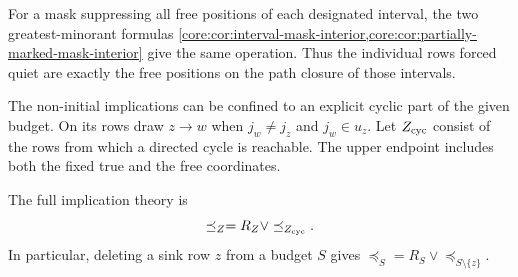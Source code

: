For a mask suppressing all free positions of each designated interval,
the two greatest-minorant formulas
\cref{core:cor:interval-mask-interior,core:cor:partially-marked-mask-interior}
give the same operation. Thus the individual rows forced quiet are
exactly the free positions on the path closure of those intervals.

The non-initial implications can be confined to an explicit cyclic part
of the given budget. On its rows draw $z\to w$ when
$j_w\ne j_z$ and $j_w\in u_z$. Let $Z_{\rm cyc}$ consist of the rows
from which a directed cycle is reachable. The upper endpoint includes
both the fixed true and the free coordinates.

\begin{theorem}
\label{core:thm:budget-cyclic-reduction}
The full implication theory is
\[
 \preceq_Z=R_Z\vee\preceq_{Z_{\rm cyc}}.
\]
In particular, deleting a sink row $z$ from a budget $S$ gives
$\preceq_S=R_S\vee\preceq_{S\setminus\{z\}}$.
\end{theorem}
